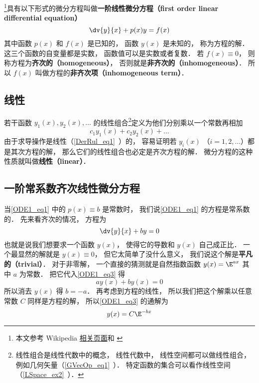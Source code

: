 
\begin{issues}
\issueNeedCite
{}
\end{issues}


\footnote{本文参考 Wikipedia \href{https://en.wikipedia.org/wiki/Ordinary_differential_equation}{相关页面}和 \cite{同济高}}具有以下形式的微分方程叫做\textbf{一阶线性微分方程（first order linear differential equation）}
\begin{equation}\label{ODE1_eq1}
\dv{y}{x} + p(x)y = f(x)
\end{equation}
其中函数 $p(x)$ 和 $f(x)$ 是已知的， 函数 $y(x)$ 是未知的， 称为方程的解． 这三个函数的自变量都是实数， 函数值可以是实数或者复数． 若 $f(x) \equiv 0$， 则称方程为\textbf{齐次的（homogeneous）}， 否则就是\textbf{非齐次的（inhomogeneous）}． 所以 $f(x)$ 叫做方程的\textbf{非齐次项（inhomogeneous term）}．

\subsection{线性}
若干函数 $y_1(x), y_2(x), \dots$ 的线性组合\footnote{线性组合是线性代数中的概念， 线性代数中， 线性空间都可以做线性组合， 例如几何矢量（\autoref{GVecOp_eq1}~）． 特定函数的集合可以看作线性空间（\autoref{LSpace_ex2}~）．}定义为他们分别乘以一个常数再相加
\begin{equation}
c_1 y_1(x) + c_2 y_2(x) + \dots
\end{equation}
由于求导操作是线性（\autoref{DerRul_eq1}~）的， 容易证明若 $y_i(x)$ （$i = 1, 2,\dots$）都是其次方程的解， 那么它们的线性组合也必定是齐次方程的解． 微分方程的这种性质就叫做\textbf{线性（linear）}．

\subsection{一阶常系数齐次线性微分方程}
当\autoref{ODE1_eq1} 中的 $p(x) \equiv b$ 是常数时， 我们说\autoref{ODE1_eq1} 的方程是常系数的． 先来看齐次的情况， 方程为
\begin{equation}\label{ODE1_eq3}
\dv{y}{x} + by = 0
\end{equation}
也就是说我们想要求一个函数 $y(x)$， 使得它的导数和 $y(x)$ 自己成正比． 一个最显然的解就是 $y(x) \equiv 0$， 但它太简单了没什么意义， 我们说这个解是\textbf{平凡的（trivial）}． 对于非零解， 一个直接的猜测就是自然指数函数 $y(x) = \E^{ax}$ 其中 $a$ 为常数． 把它代入\autoref{ODE1_eq3} 得
\begin{equation}
ay(x) + by(x) = 0
\end{equation}
所以消去 $y(x)$ 得 $b = -a$． 再考虑到方程的线性， 所以我们把这个解乘以任意常数 $C$ 同样是方程的解， 所以\autoref{ODE1_eq3} 的通解为
\begin{equation}\label{ODE1_eq5}
y(x) = C\E^{-bx}
\end{equation}

